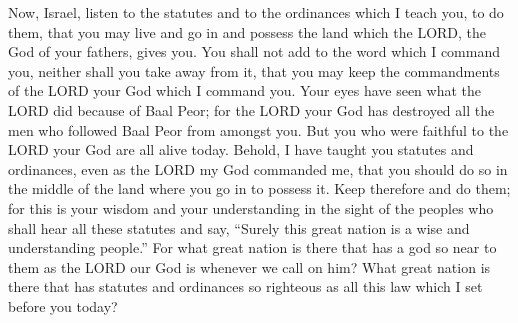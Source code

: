  Now, Israel, listen to the statutes and to the ordinances
which I teach you, to do them, that you may live and go in and possess
the land which the LORD, the God of your fathers, gives you.
 You shall not add to the word which I command you,
neither shall you take away from it, that you may keep the commandments
of the LORD your God which I command you.  Your eyes have
seen what the LORD did because of Baal Peor; for the LORD your God has
destroyed all the men who followed Baal Peor from amongst you.
 But you who were faithful to the LORD your God are all
alive today.  Behold, I have taught you statutes and
ordinances, even as the LORD my God commanded me, that you should do so
in the middle of the land where you go in to possess it. 
Keep therefore and do them; for this is your wisdom and your
understanding in the sight of the peoples who shall hear all these
statutes and say, ``Surely this great nation is a wise and understanding
people.''  For what great nation is there that has a god
so near to them as the LORD our God is whenever we call on him?
 What great nation is there that has statutes and
ordinances so righteous as all this law which I set before you today?

